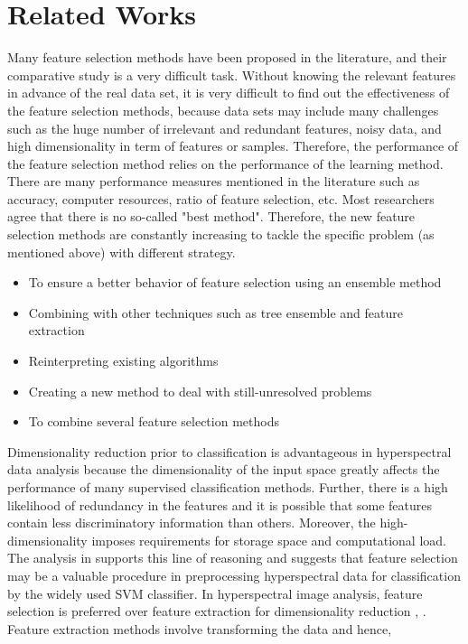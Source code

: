 \documentclass[document.tex]{subfiles}
\begin{document}
\section{Related Works}
\noindent Many feature selection methods have been proposed in the literature, and their comparative study is a very difficult task. Without knowing the relevant features in advance of
the real data set, it is very difficult to find out the effectiveness of the feature selection
methods, because data sets may include many challenges such as the huge number of irrelevant and redundant features, noisy data, and high dimensionality in term of features
or samples. Therefore, the performance of the feature selection method relies on the performance of the learning method. There are many performance measures mentioned in
the literature such as accuracy, computer resources, ratio of feature selection, etc. Most
researchers agree that there is no so-called "best method". Therefore, the new feature
selection methods are constantly increasing to tackle the specific problem (as mentioned
above) with different strategy.
\begin{itemize}
	\item To ensure a better behavior of feature selection using an ensemble method
	\item Combining with other techniques such as tree ensemble and feature extraction\cite{4}
	\item Reinterpreting existing algorithms
	\item Creating a new method to deal with still-unresolved problems
	\item To combine several feature selection methods
\end{itemize}
Dimensionality reduction prior to classification is advantageous in hyperspectral data
analysis because the dimensionality of the input space greatly affects the performance of
many supervised classification methods\cite{13}. Further, there is a high likelihood of redundancy in the features and it is possible that some features contain less discriminatory
information than others. Moreover, the high-dimensionality imposes requirements for
storage space and computational load. The analysis in \cite{1} supports this line of reasoning
and suggests that feature selection may be a valuable procedure in preprocessing hyperspectral data for classification by the widely used SVM classifier. In hyperspectral
image analysis, feature selection is preferred over feature extraction for dimensionality
reduction \cite{4}, \cite{13}. Feature extraction methods involve transforming the data and hence,
\end{document}
